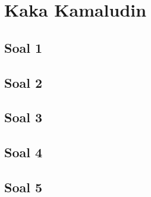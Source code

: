 
\section{Kaka Kamaludin}
\subsection{Soal 1}

\subsection{Soal 2}

\subsection{Soal 3}

\subsection{Soal 4}

\subsection{Soal 5}

